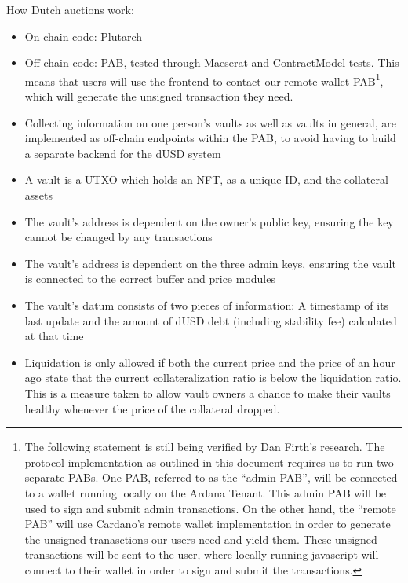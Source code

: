 \documentclass{article} %
\begin{document}
How Dutch auctions work: 


\begin{itemize}
  \item On-chain code: Plutarch
  \item Off-chain code: PAB, tested through Maeserat and ContractModel tests.
    This means that users will use the frontend to contact our remote wallet
    PAB\footnote{
      The following statement is still being verified by Dan Firth's research.
      The protocol implementation as outlined in this document requires us to
      run two separate PABs.
      One PAB, referred to as the ``admin PAB'', will be connected to a wallet
      running locally on the Ardana Tenant.
      This admin PAB will be used to sign and submit admin transactions.
      On the other hand, the ``remote PAB'' will use Cardano's remote wallet
      implementation in order to generate the unsigned tranasctions our users
      need and yield them.
      These unsigned transactions will be sent to the user, where locally
      running javascript will connect to their wallet in order to sign and
      submit the transactions.
    }, which will generate the unsigned transaction they need.
  \item Collecting information on one person's vaults as well as vaults in
    general, are implemented as off-chain endpoints within the PAB, to avoid
    having to build a separate backend for the dUSD system
  \item A vault is a UTXO which holds an NFT, as a unique ID, and the collateral
    assets
  \item The vault's address is dependent on the owner's public key, ensuring the
    key cannot be changed by any transactions
  \item The vault's address is dependent on the three admin keys, ensuring the
    vault is connected to the correct buffer and price modules
  \item The vault's datum consists of two pieces of information: A timestamp of
    its last update and the amount of dUSD debt (including stability fee)
    calculated at that time
  \item Liquidation is only allowed if both the current price and the price of
    an hour ago state that the current collateralization ratio is below the
    liquidation ratio.
    This is a measure taken to allow vault owners a chance to make their vaults
    healthy whenever the price of the collateral dropped.

\end{itemize}
\end{document}
